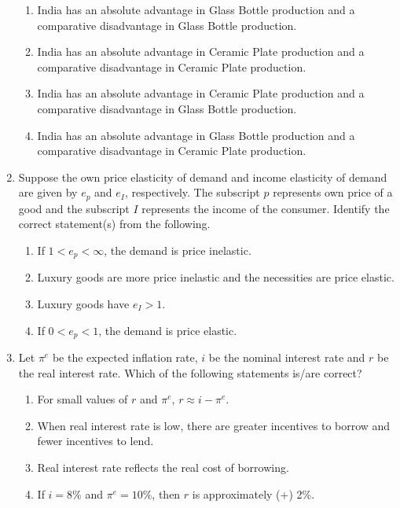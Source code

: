 \documentclass[journal,13pt,onecolumn]{exam}
\theoremstyle{remark}
\begin{document}
\begin{enumerate}[label=Q.\arabic*]
\begin{enumerate}[label=(\Alph*)]
    \item India has an absolute advantage in Glass Bottle production and a comparative disadvantage in Glass Bottle production.
    \item India has an absolute advantage in Ceramic Plate production and a comparative disadvantage in Ceramic Plate production.
    \item India has an absolute advantage in Ceramic Plate production and a comparative disadvantage in Glass Bottle production.
    \item India has an absolute advantage in Glass Bottle production and a comparative disadvantage in Ceramic Plate production.
\end{enumerate}

\item Suppose the own price elasticity of demand and income elasticity of demand are given by $e_p$ and $e_I$, respectively. The subscript $p$ represents own price of a good and the subscript $I$ represents the income of the consumer. Identify the correct statement(s) from the following.

\begin{enumerate}
    \item If $1 < e_p < \infty$, the demand is price inelastic.
    \item Luxury goods are more price inelastic and the necessities are price elastic.
    \item Luxury goods have $e_I > 1$.
    \item If $0 < e_p < 1$, the demand is price elastic.
\end{enumerate}

\item Let $\pi^e$ be the expected inflation rate, $i$ be the nominal interest rate and $r$ be the real interest rate. Which of the following statements is/are correct?

\begin{enumerate}
    \item For small values of $r$ and $\pi^e$, $r \approx i - \pi^e$.
    \item When real interest rate is low, there are greater incentives to borrow and fewer incentives to lend.
    \item Real interest rate reflects the real cost of borrowing.
    \item If $i = 8\%$ and $\pi^e = 10\%$, then $r$ is approximately (+) 2\%.
\end{enumerate}


\end{enumerate}
\end{document}
